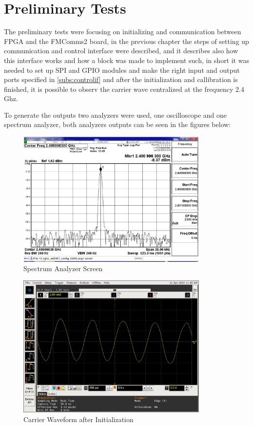 \newpage

\section{Preliminary Tests}
\label{result:conf}

The preliminary tests were focusing on initializing and communication between FPGA
and the FMComms2 board, in the previous chapter the steps of setting up communication
and control interface were described, and it describes also how this interface works
and how a block was made to implement such, in short it was needed to set up SPI and GPIO
modules and make the right input and output ports specified in \ref{subs:controlif} and
after the initialization and callibration is finished, it is possible to observ the
carrier wave centralized at the frequency 2.4 Ghz.

To generate the outputs two analyzers were used, one oscilloscope and one spectrum analyzer,
both analyzers outputs can be seen in the figures below:

\begin{figure}[htbp]
    \centering
    \includegraphics[width=0.85\textwidth]{./figures/spectrum_init}
    \caption{ Spectrum Analyzer Screen
    \label{fig:spec}}
\end{figure}

\begin{figure}[htbp]
    \centering
    \includegraphics[width=0.85\textwidth]{./figures/oscill_init}
    \caption{ Carrier Waveform after Initialization
    \label{fig:oscillinit}}
\end{figure}

